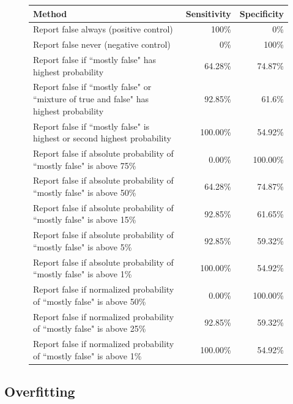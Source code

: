 \documentclass[12pt]{article}
\begin{document}
\begin{figure}[H]
\begin{center}
{\renewcommand{\arraystretch}{1.5}
\begin{tabular}{|| p{} | r | r ||}

\hline \hline
\textbf{Method} & \textbf{Sensitivity} & \textbf{Specificity} \\
\hline \hline

Report false always (positive control) & 100\% & 0\% \\ 
\hline
Report false never (negative control) & 0\% & 100\% \\
\hline
Report false if ``mostly false" has highest probability & 64.28\% & 74.87\% \\
\hline
Report false if ``mostly false" or ``mixture of true and false" has highest probability & 92.85\% & 61.6\% \\
\hline
Report false if ``mostly false" is highest or second highest probability & 100.00\% & 54.92\% \\
\hline
Report false if absolute probability of ``mostly false" is above 75\% & 0.00\% & 100.00\% \\
\hline 
Report false if absolute probability of ``mostly false" is above 50\% & 64.28\% & 74.87\% \\
\hline 
Report false if absolute probability of ``mostly false" is above 15\% & 92.85\% & 61.65\% \\
\hline 
Report false if absolute probability of ``mostly false" is above 5\% & 92.85\% & 59.32\% \\
\hline 
Report false if absolute probability of ``mostly false" is above 1\% & 100.00\% & 54.92\% \\
\hline 
Report false if normalized probability of ``mostly false" is above 50\% & 0.00\% & 100.00\% \\
\hline 
Report false if normalized probability of ``mostly false" is above 25\% & 92.85\% & 59.32\% \\
\hline 
Report false if normalized probability of ``mostly false" is above 1\% & 100.00\% & 54.92\% \\

\hline \hline
\end{tabular}
}
\end{center}
\end{figure}

\subsection*{Overfitting}
\end{document}
